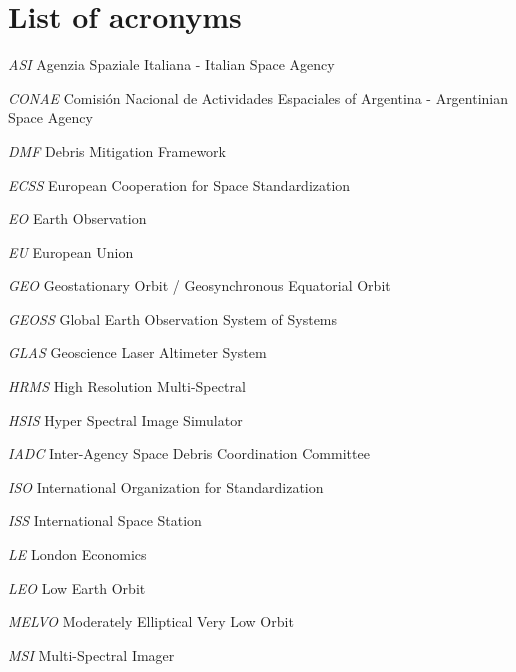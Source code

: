 \documentclass[12pt,a4paper,notitlepage,twoside,openright]{report}
\begin{document}





%

\newpage



\chapter*{List of acronyms}
\begin{abbrv}
\item[\textit{ASI}] Agenzia Spaziale Italiana - Italian Space Agency
\item[\textit{CONAE}] Comisión Nacional de Actividades Espaciales of Argentina - \newline Argentinian Space Agency
\item[\textit{DMF}] Debris Mitigation Framework
\item[\textit{ECSS}] European Cooperation for Space Standardization
\item[\textit{EO}] Earth Observation
\item[\textit{EU}] European Union
\item[\textit{GEO}] Geostationary Orbit / Geosynchronous Equatorial Orbit
\item[\textit{GEOSS}] Global Earth Observation System of Systems
\item[\textit{GLAS}] Geoscience Laser Altimeter System
\item[\textit{HRMS}] High Resolution Multi-Spectral
\item[\textit{HSIS}] Hyper Spectral Image Simulator
\item[\textit{IADC}] Inter-Agency Space Debris Coordination Committee
\item[\textit{ISO}] International Organization for Standardization
\item[\textit{ISS}] International Space Station
\item[\textit{LE}] London Economics
\item[\textit{LEO}] Low Earth Orbit
\item[\textit{MELVO}] Moderately Elliptical Very Low Orbit
\item[\textit{MSI}] Multi-Spectral Imager

\end{abbrv}
\end{document}
